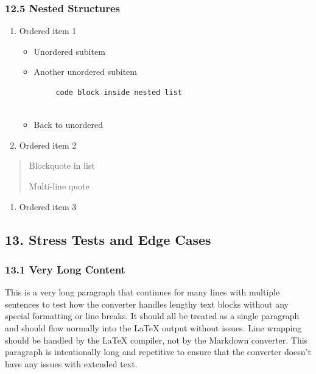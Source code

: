 \documentclass{article}
\begin{document}
\subsubsection{ 12.5 Nested Structures}

\begin{enumerate}
\item  Ordered item 1
\begin{itemize}
\item  Unordered subitem
\item  Another unordered subitem
\begin{verbatim}
     code block inside nested list
     
\end{verbatim}


\item  Back to unordered
\end{itemize}


\item  Ordered item 2
\end{enumerate}

\begin{quote}
 Blockquote in list

 Multi-line quote

\end{quote}

\begin{enumerate}
\item  Ordered item 3
\end{enumerate}

\noindent\hrulefill

\subsection{ 13. Stress Tests and Edge Cases}

\subsubsection{ 13.1 Very Long Content}

This is a very long paragraph that continues for many lines with multiple sentences to test how the converter handles lengthy text blocks without any special formatting or line breaks. It should all be treated as a single paragraph and should flow normally into the LaTeX output without issues. Line wrapping should be handled by the LaTeX compiler, not by the Markdown converter. This paragraph is intentionally long and repetitive to ensure that the converter doesn't have any issues with extended text.
\end{document}
